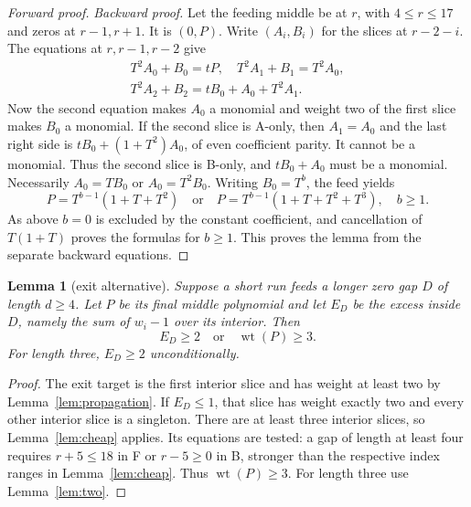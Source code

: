 \documentclass{article}
\newtheorem{lemma}{Lemma}
\DeclareMathOperator{\wt}{wt}
\begin{document}
\begin{proof}[Forward proof]
  \emph{Backward proof.} Let the feeding middle be at \(r\), with \(4 \le r \le 17\) and zeros at
  \(r - 1, r + 1\). It is \((0, P)\). Write \((A_i, B_i)\) for the slices at \(r - 2 - i\). The
  equations at \(r, r - 1, r - 2\) give
  \begin{equation}\label{eq:cheap-backward}
    \begin{gathered}
      T^2 A_0 + B_0 = tP, \quad T^2 A_1 + B_1 = T^2 A_0, \\
      T^2 A_2 + B_2 = t B_0 + A_0 + T^2 A_1.
    \end{gathered}
  \end{equation}
  Now the second equation makes \(A_0\) a monomial and weight two of the first slice makes
  \(B_0\) a monomial. If the second slice is A-only, then \(A_1 = A_0\) and the last right side is
  \(t B_0 + (1 + T^2) A_0\), of even coefficient parity. It cannot be a monomial. Thus the second
  slice is B-only, and \(t B_0 + A_0\) must be a monomial. Necessarily \(A_0 = T B_0\) or
  \(A_0 = T^2 B_0\). Writing \(B_0 = T^b\), the feed yields
  \begin{equation}
    P = T^{b-1} (1 + T + T^2) \quad \text{or} \quad
    P = T^{b-1} (1 + T + T^2 + T^3), \quad b \ge 1.
  \end{equation}
  As above \(b = 0\) is excluded by the constant coefficient, and cancellation of \(T(1 + T)\)
  proves the formulas for \(b \ge 1\). This proves the lemma from the separate backward
  equations.
\end{proof}

\begin{lemma}[exit alternative]\label{lem:alternative}
  Suppose a short run feeds a longer zero gap \(D\) of length \(d \ge 4\). Let \(P\) be its final
  middle polynomial and let \(E_D\) be the excess inside \(D\), namely the sum of \(w_i - 1\) over
  its interior. Then
  \begin{equation}\label{eq:exit-alternative}
    E_D \ge 2 \quad \text{or} \quad \wt(P) \ge 3.
  \end{equation}
  For length three, \(E_D \ge 2\) unconditionally.
\end{lemma}

\begin{proof}
  The exit target is the first interior slice and has weight at least two by
  Lemma~\ref{lem:propagation}. If \(E_D \le 1\), that slice has weight exactly two and every
  other interior slice is a singleton. There are at least three interior slices, so
  Lemma~\ref{lem:cheap} applies. Its equations are tested: a gap of length at least four
  requires \(r + 5 \le 18\) in F or \(r - 5 \ge 0\) in B, stronger than the respective index
  ranges in Lemma~\ref{lem:cheap}. Thus \(\wt(P) \ge 3\). For length three use
  Lemma~\ref{lem:two}.
\end{proof}
\end{document}
